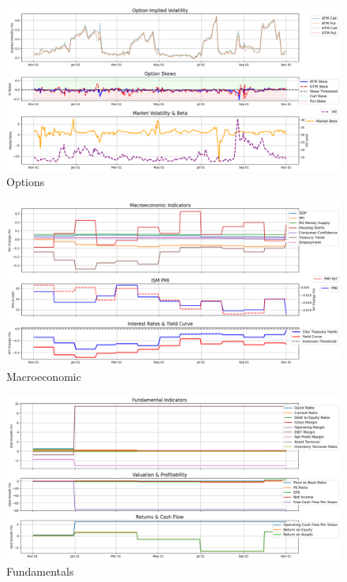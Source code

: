 \documentclass[8pt]{scrartcl}
\begin{document}
\begin{figure}[H]
    \centering
    \includegraphics[width=1\linewidth]{judge_reviews/AMZN_M_gpt-4o-mini/2015-11-02/judge_Option_Implied_Volatility.png}
    \caption{Options}
\end{figure}

\begin{figure}[H]
    \centering
    \includegraphics[width=1\linewidth]{judge_reviews/AMZN_M_gpt-4o-mini/2015-11-02/judge_Macroeconomic_Indicators.png}
    \caption{Macroeconomic}
\end{figure}

\begin{figure}[H]
    \centering
    \includegraphics[width=1\linewidth]{judge_reviews/AMZN_M_gpt-4o-mini/2015-11-02/judge_Fundamental_Indicators.png}
    \caption{Fundamentals}
\end{figure}
\end{document}
